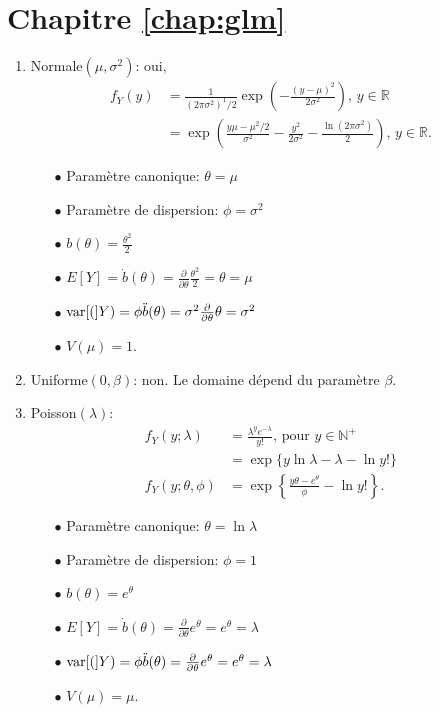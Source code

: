 \section*{Chapitre \ref{chap:glm}}

\begin{solution}{2.1}
\begin{enumerate}
\item Normale$(\mu,\sigma^2)$: oui,
\begin{align*}
f_{Y}(y)&=\frac{1}{(2\pi\sigma^2)^1/2}\exp\left(-\frac{(y-\mu)^2}{2\sigma^2}\right),\, y\in\mathbb{R}\\
&=\exp\left(\frac{y\mu-\mu^2/2}{\sigma^2}-\frac{y^2}{2\sigma^2}-\frac{\ln(2\pi\sigma^2)}{2}\right),\, y\in\mathbb{R}.
\end{align*}
\begin{itemize}
\item[$\bullet$] Paramètre canonique: $\theta=\mu$
\item[$\bullet$] Paramètre de dispersion: $\phi=\sigma^2$
\item[$\bullet$] $b(\theta)=\frac{\theta^2}{2}$
\item[$\bullet$] $E[Y]=\dot{b}(\theta)=\frac{\partial}{\partial\theta}\frac{\theta^2}{2}=\theta=\mu$
\item[$\bullet$] $\mathrm{var} [ ( ]Y)=\phi\ddot{b}(\theta)=\sigma^2\frac{\partial}{\partial\theta}\theta=\sigma^2$
\item[$\bullet$] $V(\mu)=1$.
\end{itemize}

\item Uniforme$(0,\beta)$: non. Le domaine dépend du paramètre $\beta$.
\item Poisson$(\lambda)$:
\begin{align*}
f_{Y}(y;\lambda)&=\frac{\lambda^{y}e^{-\lambda}}{y!} \mbox{, pour }y\in \mathbb{N}^{+}\\
&=\exp\{y\ln \lambda - \lambda - \ln y!\}\\
f_{Y}(y;\theta,\phi)&=\exp\left\{\frac{y\theta - e^{\theta}}{\phi} - \ln y!\right\}.
\end{align*}
\begin{itemize}
\item[$\bullet$] Paramètre canonique: $\theta=\ln \lambda$
\item[$\bullet$] Paramètre de dispersion: $\phi=1$
\item[$\bullet$] $b(\theta)=e^{\theta}$
\item[$\bullet$] $E[Y]=\dot{b}(\theta)=\frac{\partial}{\partial\theta}e^{\theta}=e^{\theta}=\lambda$
\item[$\bullet$] $\mathrm{var} [ ( ]Y)=\phi\ddot{b}(\theta)=\frac{\partial}{\partial\theta}e^{\theta}=e^{\theta}=\lambda$
\item[$\bullet$] $V(\mu)=\mu$.
\end{itemize}


\end{enumerate}
\end{solution}
